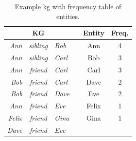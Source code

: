 \begin{table}[htbp]
\centering
\begin{tabular}{rcl|lcc}
\multicolumn{3}{c|}{\textbf{KG}}                    &  & \multicolumn{1}{l}{\textbf{Entity}} & \multicolumn{1}{l}{\textbf{Freq.}} \\\hline
\textit{Ann} & \textit{sibling} & \textit{Bob}   &  & Ann                               & 4                                      \\
\textit{Ann} & \textit{sibling} & \textit{Carl} &  & Bob                                 & 3                                      \\
\textit{Ann} & \textit{friend}  & \textit{Carl} &  & Carl                               & 3                                      \\
\textit{Bob}   & \textit{friend}  & \textit{Carl} &  & Dave                                & 2                                      \\
\textit{Bob}   & \textit{friend}  & \textit{Dave}  &  & Eve                                 & 2                                      \\
\textit{Ann} & \textit{friend}  & \textit{Eve}   &  & Felix                               & 1                                      \\
\textit{Felix} & \textit{friend}  & \textit{Gina}  &  & Gina                                & 1                                      \\
\textit{Dave}  & \textit{friend}  & \textit{Eve}   &  & \multicolumn{1}{l}{}                & \multicolumn{1}{l}{}                  
\end{tabular}
\caption[Example KG with frequency table of entities.]{Example \gls{kg} with frequency table of entities.}
\label{entity_selection_KG}
\end{table}

